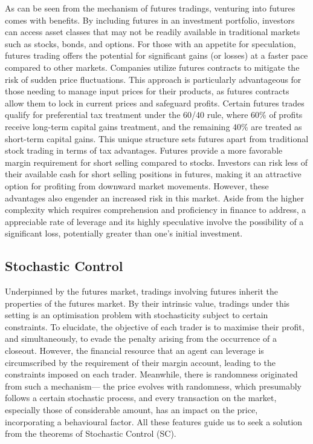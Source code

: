 \documentclass[11pt,twoside]{article}
\numberwithin{Theorem}{section}
\numberwithin{Definition}{section}
\numberwithin{Lemma}{section}
\numberwithin{Algorithm}{section}
\numberwithin{equation}{section}
\begin{document}
As can be seen from the mechanism of futures tradings, venturing into futures comes with benefits. By including futures in an investment portfolio, investors can access asset classes that may not be readily available in traditional markets such as stocks, bonds, and options. For those with an appetite for speculation, futures trading offers the potential for significant gains (or losses) at a faster pace compared to other markets. Companies utilize futures contracts to mitigate the risk of sudden price fluctuations. This approach is particularly advantageous for those needing to manage input prices for their products, as futures contracts allow them to lock in current prices and safeguard profits. Certain futures trades qualify for preferential tax treatment under the 60/40 rule, where 60\% of profits receive long-term capital gains treatment, and the remaining 40\% are treated as short-term capital gains. This unique structure sets futures apart from traditional stock trading in terms of tax advantages. Futures provide a more favorable margin requirement for short selling compared to stocks. Investors can risk less of their available cash for short selling positions in futures, making it an attractive option for profiting from downward market movements. However, these advantages also engender an increased risk in this market. Aside from the higher complexity which requires comprehension and proficiency in finance to address, a appreciable rate of leverage and its highly speculative involve the possibility of a significant loss, potentially greater than one's initial investment.

\clearpage

\subsection{Stochastic Control}
\label{sec:SC}
Underpinned by the futures market, tradings involving futures inherit the properties of the futures market. By their intrinsic value, tradings under this setting is an optimisation problem with stochasticity subject to certain constraints. To elucidate, the objective of each trader is to maximise their profit, and simultaneously, to evade the penalty arising from the occurrence of a closeout. However, the financial resource that an agent can leverage is circumscribed by the requirement of their margin account, leading to the constraints imposed on each trader. Meanwhile, there is randomness originated from such a mechanism— the price evolves with randomness, which presumably follows a certain stochastic process, and every transaction on the market, especially those of considerable amount, has an impact on the price, incorporating a behavioural factor. All these features guide us to seek a solution from the theorems of Stochastic Control (SC).
\end{document}
